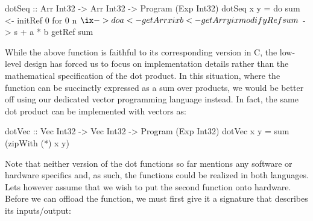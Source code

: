 \documentclass[../main.tex]{subfiles}
\begin{document}
\begin{code}
dotSeq :: Arr Int32 -> Arr Int32 -> Program (Exp Int32)
dotSeq x y = do
  sum <- initRef 0
  for 0 n $ \ix -> do
    a <- getArr x ix
    b <- getArr y ix
    modifyRef sum $ \s -> s + a * b
  getRef sum
\end{code}

While the above function is faithful to its corresponding version in C, the low-level design has forced us to focus on implementation details rather than the mathematical specification of the dot product. In this situation, where the function can be succinctly expressed as a sum over products, we would be better off using our dedicated vector programming language instead. In fact, the same dot product can be implemented with vectors as:

\begin{code}
dotVec :: Vec Int32 -> Vec Int32 -> Program (Exp Int32)
dotVec x y = sum (zipWith (*) x y)
\end{code}


Note that neither version of the dot functions so far mentions any software or hardware specifics and, as such, the functions could be realized in both languages. Lets however assume that we wish to put the second function onto hardware. Before we can offload the function, we must first give it a signature that describes its inputs/output:



\end{document}
